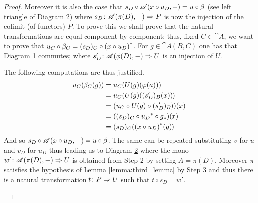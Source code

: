 \begin{proof}
  Moreover it is also the case that \(s_D\circ{\mathscr A}(x\circ u_D,-) = u\circ\beta\) (see left triangle of Diagram \ref{diagram:two_triangles}) where \(s_D\colon {\mathscr A}(\pi(D),-)\Rightarrow P\) is now the injection of the colimit (of functors) \(P\). To prove this we shall prove that the natural transformations are equal component by component; thus, fixed \(C\in\cat{A}\), we want to prove that \(u_C\circ\beta_C = (s_D)_C\circ{(x\circ u_D)}^*\). For \(g\in\cat{A}(B, C)\) one has that Diagram \ref{diagram:s} commutes; where \(s'_D\colon {\mathscr A}(\phi(D),-)\Rightarrow U\) is an injection of \(U\).
  \begin{figure}[ht]
    \begin{center}
    \end{center}
    \caption{}
    \label{diagram:s}
  \end{figure}

  \noindent The following computations are thus justified.
  \begin{align*}
    u_C(\beta_C(g)) &= u_C(U(g)(\varphi(a)))\\
                    &= u_C(U(g)((s'_D)_B(x)))\\
                    &= (u_C\circ U(g)\circ (s'_D)_B))(x)\\
                    &= ((s_D)_C\circ {u_D}^*\circ {g}_*)(x)\\
                    &= (s_D)_C({(x\circ u_D)}^*(g))
  \end{align*}
  And so \(s_D\circ{\mathscr A}(x\circ u_D,-) = u\circ\beta\). The same can be repeated substituting \(v\) for \(u\) and \(v_D\) for \(u_D\) thus leading us to Diagram \ref{diagram:two_triangles} where the mono \(w'\colon {\mathscr A}(\pi(D),-)\Rightarrow U\) is obtained from Step 2 by setting \(A = \pi(D)\). Moreover \(\pi\) satisfies the hypothesis of Lemma \ref{lemma:third_lemma} by Step 3 and thus there is a natural transformation \(t\colon P\Rightarrow U\) such that \(t\circ s_D = w'\).

  \begin{figure}
    \begin{center}
    \end{center}
    \caption{}
    \label{diagram:two_triangles}
  \end{figure}


\end{proof}

